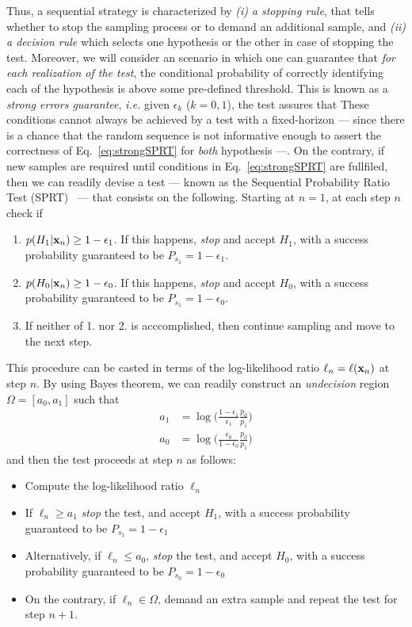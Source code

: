 Thus, a sequential strategy is characterized by \textit{(i)} \textit{a stopping rule}, that tells whether to stop the sampling process or to demand an additional sample, and \textit{(ii)} \textit{a decision rule} which selects one hypothesis or the other in case of stopping the test. Moreover, we will consider an scenario in which one can guarantee that \textit{for each realization of the test}, the conditional probability of correctly identifying each of the hypothesis is above some pre-defined threshold. This is known as a \textit{strong errors guarantee}, \textit{i.e.} given $\epsilon_k$ ($k=0,1$), the test assures that
These conditions cannot always be achieved by a test with a fixed-horizon --- since there is a chance that the random sequence is not informative enough to assert the correctness of Eq.~\ref{eq:strongSPRT} for \textit{both} hypothesis ---. On the contrary, if new samples are required until conditions in Eq.~\ref{eq:strongSPRT} are fullfiled, then we can readily devise a test --- known as the Sequential Probability Ratio Test (SPRT)~\cite{Wald1948Optimum} --- that consists on the following. Starting at $n=1$, at each step $n$ check if
\begin{enumerate}
\item $p(H_1|\mathbf{x}_n) \geq 1-\epsilon_1$. If this happens, \textit{stop} and accept $H_1$, with a success probability guaranteed to be $P_{s_1} = 1-\epsilon_1$.
\item $p(H_0|\mathbf{x}_n) \geq 1-\epsilon_0$. If this happens, \textit{stop} and accept $H_0$, with a success probability guaranteed to be $P_{s_1} = 1-\epsilon_0$.
\item If neither of 1. nor 2. is acccomplished, then continue sampling and move to the next step.
\end{enumerate}
This procedure can be casted in terms of the log-likelihood ratio $\ell_n = \ell(\mathbf{x}_n)$ at step $n$. By using Bayes theorem, we can readily construct an \textit{undecision} region $\Omega = [a_0, a_1]$ such that
\begin{align}\label{eq:decisionsASPRT}
a_1 &= \log{ \Big(\frac{1-\epsilon_1}{\epsilon_1} \frac{p_0}{p_1} \Big)}\\
a_0 &= \log{\Big(\frac{\epsilon_0}{1-\epsilon_0}\frac{p_0}{p_1} \Big)}\nonumber
\end{align}
and then the test proceeds at step $n$ as follows:
\begin{itemize}
\item Compute the log-likelihood ratio $\ell_n$
\item If $\ell_n \geq a_1$ \textit{stop} the test, and accept $H_1$, with a success probability guaranteed to be $P_{s_1} = 1-\epsilon_1$
\item Alternatively, if $\ell_n \leq a_0$, \textit{stop} the test, and accept $H_0$, with a success probability guaranteed to be $P_{s_0} = 1-\epsilon_0$
\item On the contrary, if $\ell_n \in \Omega$, demand an extra sample and repeat the test for step $n+1$.
\end{itemize}

